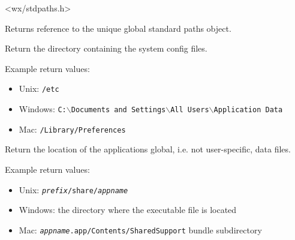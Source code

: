 
<wx/stdpaths.h>






\label{wxstandardpathsget}


Returns reference to the unique global standard paths object.


\label{wxstandardpathsgetconfigdir}


Return the directory containing the system config files.

Example return values:
\begin{itemize}
    \item Unix: \texttt{/etc}
    \item Windows: \texttt{C:$\backslash$Documents and Settings$\backslash$All Users$\backslash$Application Data}
    \item Mac: \texttt{/Library/Preferences}
\end{itemize}




\label{wxstandardpathsgetdatadir}


Return the location of the applications global, i.e. not user-specific,
data files.

Example return values:
\begin{itemize}
    \item Unix: \texttt{\textit{prefix}/share/\textit{appname}}
    \item Windows: the directory where the executable file is located
    \item Mac: \texttt{\textit{appname}.app/Contents/SharedSupport} bundle subdirectory
\end{itemize}




\label{wxstandardpathsgetdocumentsdir}


